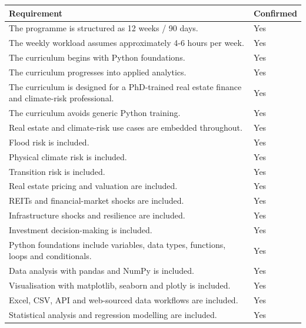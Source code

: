 \documentclass[
  a4paper,
]{article}
\newcounter{none} %
\begin{document}
{\def\LTcaptype{none} %
\begin{longtable}[]{@{}
  >{\raggedright\arraybackslash}p{}
  >{\raggedright\arraybackslash}p{}@{}}
\toprule\noalign{}
\begin{minipage}[b]{\linewidth}\raggedright
Requirement
\end{minipage} & \begin{minipage}[b]{\linewidth}\raggedright
Confirmed
\end{minipage} \\
\midrule\noalign{}
\endhead
\bottomrule\noalign{}
\endlastfoot
The programme is structured as 12 weeks / 90 days. & Yes \\
The weekly workload assumes approximately 4-6 hours per week. & Yes \\
The curriculum begins with Python foundations. & Yes \\
The curriculum progresses into applied analytics. & Yes \\
The curriculum is designed for a PhD-trained real estate finance and
climate-risk professional. & Yes \\
The curriculum avoids generic Python training. & Yes \\
Real estate and climate-risk use cases are embedded throughout. & Yes \\
Flood risk is included. & Yes \\
Physical climate risk is included. & Yes \\
Transition risk is included. & Yes \\
Real estate pricing and valuation are included. & Yes \\
REITs and financial-market shocks are included. & Yes \\
Infrastructure shocks and resilience are included. & Yes \\
Investment decision-making is included. & Yes \\
Python foundations include variables, data types, functions, loops and
conditionals. & Yes \\
Data analysis with pandas and NumPy is included. & Yes \\
Visualisation with matplotlib, seaborn and plotly is included. & Yes \\
Excel, CSV, API and web-sourced data workflows are included. & Yes \\
Statistical analysis and regression modelling are included. & Yes \\

\end{longtable}}
\end{document}
